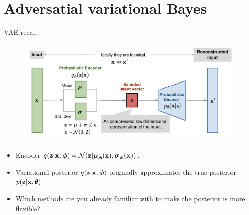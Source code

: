 \section{Adversatial variational Bayes}
\begin{frame}{VAE recap}
	\vspace{-0.3cm}
	\begin{figure}[h]
		\centering
		\includegraphics[width=\linewidth]{figs/vae-gaussian.png}
	\end{figure}
	\vspace{-0.5cm}
	\begin{itemize}
		\item Encoder $q(\mathbf{z} | \mathbf{x}, \boldsymbol{\phi}) = \mathcal{N}(\mathbf{z} | \boldsymbol{\mu}_{\boldsymbol{\phi}}(\mathbf{x}), \boldsymbol{\sigma}_{\boldsymbol{\phi}}(\mathbf{x}))$.
		\item Variational posterior $q(\mathbf{z} | \mathbf{x}, \boldsymbol{\phi})$ originally approximates the true posterior $p(\mathbf{z} | \mathbf{x}, \boldsymbol{\theta})$.
		\item Which methods are you already familiar with to make the posterior is more flexible?
	\end{itemize}
\end{frame}
